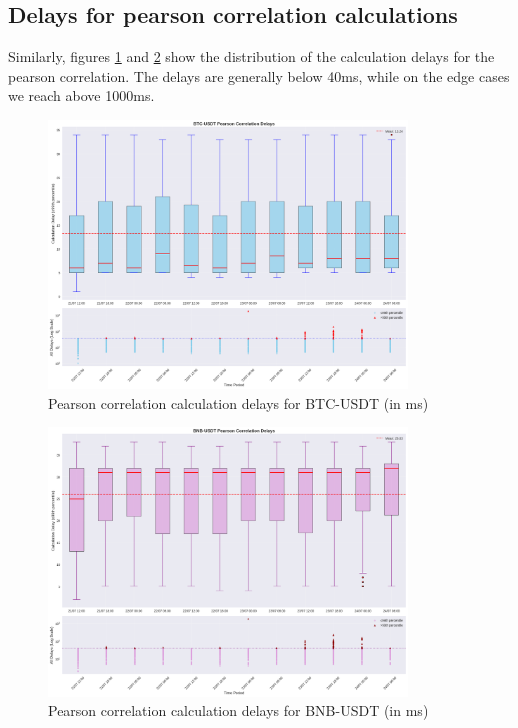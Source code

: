 \documentclass{article}
\begin{document}
\subsection{Delays for pearson correlation calculations}
Similarly, figures \ref{alg:delay-pc-btc} and \ref{alg:delay-pc-bnb} show the distribution of the calculation delays 
for the pearson correlation.
The delays are generally below 40ms, while on the edge cases we reach above 1000ms.

\begin{figure}[H]
    \centering
    \includegraphics[width=0.85\textwidth]{boxplot-PC-BTC.png}
    \caption{Pearson correlation calculation delays for BTC-USDT (in ms)}
    \label{alg:delay-pc-btc}
\end{figure}

\begin{figure}[H]
    \centering
    \includegraphics[width=0.85\textwidth]{boxplot-PC-BNB.png}
    \caption{Pearson correlation calculation delays for BNB-USDT (in ms)}
    \label{alg:delay-pc-bnb}
\end{figure}
\end{document}
